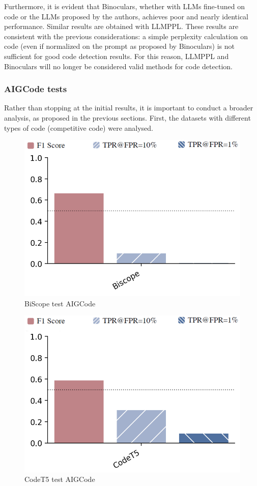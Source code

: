 Furthermore, it is evident that Binoculars, whether with LLMs fine-tuned on 
code or the LLMs proposed by the authors, achieves poor and nearly identical 
performance. Similar results are obtained with LLMPPL. These results are 
consistent with the previous considerations: a simple perplexity calculation 
on code (even if normalized on the prompt as proposed by Binoculars) is not 
sufficient for good code detection results. For this reason, LLMPPL and 
Binoculars will no longer be considered valid methods for code detection.



\subsubsection{AIGCode tests}
Rather than stopping at the initial results, it is important to conduct a broader analysis, 
as proposed in the previous sections. First, the datasets with different types of code 
(competitive code) were analysed.


\begin{figure}[H]
    \centering
    \includegraphics[width=0.5\linewidth]{img/TEST/ohoh/Biscope/7fa9c7d1ea22da46609c545fb077148bf7a0588196aa968883085c29.png}
    \caption{BiScope test AIGCode}
    \label{fig:c1}
\end{figure}



\begin{figure}[H]
    \centering
    \includegraphics[width=0.5\linewidth]{img/TEST/CodeT5/CodemirageAIG/c4956c36c6626a77f6652d1ebf105dbfddb991daccefd5e07418da50.png}
    \caption{CodeT5 test AIGCode}
    \label{fig:c2}
\end{figure}



